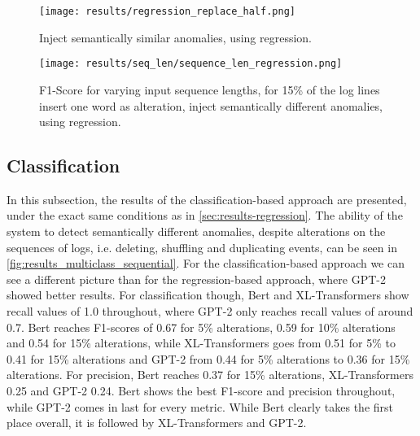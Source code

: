 
\begin{figure}[H]
  \centering
  \captionsetup{justification=centering}
  \texttt{[image: results/regression\_replace\_half.png]}\\
  \caption{Inject semantically similar anomalies, using regression.}
  \label{fig:replace_words_regression}
\end{figure}

\begin{figure}[H]
  \centering
  \captionsetup{justification=centering}
  \texttt{[image: results/seq\_len/sequence\_len\_regression.png]}\\
  \caption{F1-Score for varying input sequence lengths, for 15\% of the log lines insert one word as alteration, inject semantically different anomalies, using regression.}
  \label{fig:seq_len_regression}
\end{figure}




\newpage
\subsection{Classification\label{sec:results-classification}}
In this subsection, the results of the classification-based approach are presented, under the exact same conditions as in \ref{sec:results-regression}. 
The ability of the system to detect semantically different anomalies, despite alterations on the sequences of logs, i.e. deleting, shuffling and duplicating events, can be seen in \ref{fig:results_multiclass_sequential}. For the classification-based approach we can see a different picture than for the regression-based approach, where GPT-2 showed better results. For classification though, Bert and XL-Transformers show recall values of 1.0 throughout, where GPT-2 only reaches recall values of around 0.7. Bert reaches F1-scores of 0.67 for 5\% alterations, 0.59 for 10\% alterations and 0.54 for 15\% alterations, while XL-Transformers goes from 0.51 for 5\% to 0.41 for 15\% alterations and GPT-2 from 0.44 for 5\% alterations to 0.36 for 15\% alterations. For precision, Bert reaches 0.37 for 15\% alterations, XL-Transformers 0.25 and GPT-2 0.24.
Bert shows the best F1-score and precision throughout, while GPT-2 comes in last for every metric. While Bert clearly takes the first place overall, it is followed by XL-Transformers and GPT-2.

